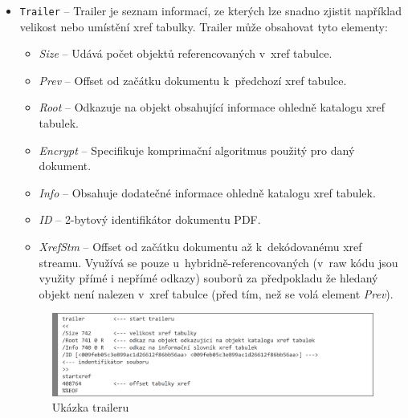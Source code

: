 \begin{itemize}
	\item \verb|Trailer| --  Trailer je seznam informací, ze kterých lze snadno zjistit například velikost nebo umístění xref tabulky. Trailer může obsahovat tyto elementy:
	\begin{itemize}
		\item \textit{Size} -- Udává počet objektů referencovaných v~xref tabulce. 
		\item \textit{Prev} -- Offset od začátku dokumentu k~předchozí xref tabulce.
		\item \textit{Root} -- Odkazuje na objekt obsahující informace ohledně katalogu xref tabulek.
		\item \textit{Encrypt} -- Specifikuje komprimační algoritmus použitý pro daný dokument.
		\item \textit{Info} -- Obsahuje dodatečné informace ohledně katalogu xref tabulek.
		\item \textit{ID} -- 2-bytový identifikátor dokumentu PDF.
		\item \textit{XrefStm} -- Offset od začátku dokumentu až k~dekódovanému xref streamu. Využívá se pouze u~hybridně-referencovaných (v~raw kódu jsou využity přímé i nepřímé odkazy) souborů za předpokladu že hledaný objekt není nalezen v~xref tabulce (před tím, než se volá element \textit{Prev}). 
	\end{itemize}
	\begin{figure}[h!]
	\centering
	\includegraphics[width=15cm]{img/pdf_trailer}
	\caption{Ukázka traileru}
	\label{fig:pdf_trailer}
	\end{figure}
\end{itemize}
